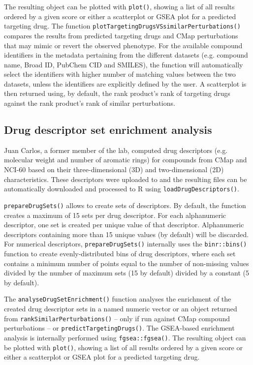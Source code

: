 The resulting object can be plotted with \texttt{plot()}, showing a list of all results ordered by a given score or either a scatterplot or GSEA plot for a predicted targeting drug. The function \texttt{plotTargetingDrugsVSsimilarPerturbations()} compares the results from predicted targeting drugs and CMap perturbations that may mimic or revert the observed phenotype. For the available compound identifiers in the metadata pertaining from the different datasets (e.g. compound name, Broad ID, PubChem CID and SMILES), the function will automatically select the identifiers with higher number of matching values between the two datasets, unless the identifiers are explicitly defined by the user. A scatterplot is then returned using, by default, the rank product’s rank of targeting drugs against the rank product’s rank of similar perturbations.

\subsection{Drug descriptor set enrichment analysis}

Juan Carlos, a former member of the lab, computed drug descriptors (e.g. molecular weight and number of aromatic rings) for compounds from CMap and NCI-60 based on their three-dimensional (3D) and two-dimensional (2D) characteristics. These descriptors were uploaded to  and the resulting files can be automatically downloaded and processed to R using \texttt{loadDrugDescriptors()}.

\texttt{prepareDrugSets()} allows to create sets of descriptors. By default, the function creates a maximum of 15 sets per drug descriptor. For each alphanumeric descriptor, one set is created per unique value of that descriptor. Alphanumeric descriptors containing more than 15 unique values (by default) will be discarded. For numerical descriptors, \texttt{prepareDrugSets()} internally uses the \texttt{binr::bins()} function to create evenly-distributed bins of drug descriptors, where each set contains a minimum number of points equal to the number of non-missing values divided by the number of maximum sets (15 by default) divided by a constant (5 by default).

The \texttt{analyseDrugSetEnrichment()} function analyses the enrichment of the created drug descriptor sets in a named numeric vector or an object returned from \texttt{rankSimilarPerturbations()} – only if run against CMap compound perturbations – or \texttt{predictTargetingDrugs()}. The GSEA-based enrichment analysis is internally performed using \texttt{fgsea::fgsea()}. The resulting object can be plotted with \texttt{plot()}, showing a list of all results ordered by a given score or either a scatterplot or GSEA plot for a predicted targeting drug.

